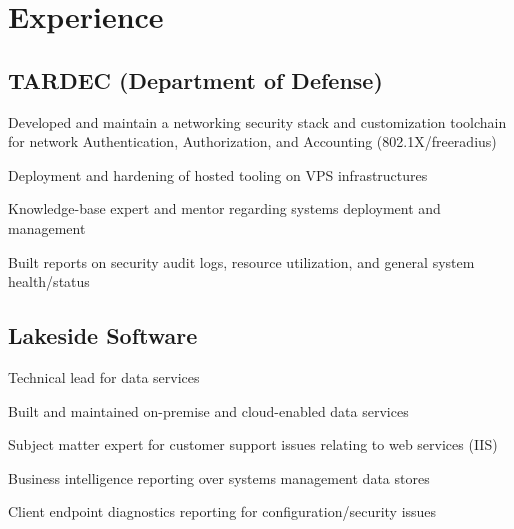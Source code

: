 \documentclass[]{deedy-resume-openfont}
\begin{document}
\hfill
\begin{minipage}[t]{0.66\textwidth}


\section{Experience}

\subsection{TARDEC (Department of Defense)}
\vspace{\topsep} 
\begin{tightemize}
\item Developed and maintain a networking security stack and customization toolchain for network Authentication, Authorization, and Accounting (802.1X/freeradius)
\item Deployment and hardening of hosted tooling on VPS infrastructures
\item Knowledge-base expert and mentor regarding systems deployment and management
\item Built reports on security audit logs, resource utilization, and general system health/status
\end{tightemize}
\sectionsep

\subsection{Lakeside Software}
\begin{tightemize}
\item Technical lead for data services
\item Built and maintained on-premise and cloud-enabled data services
\item Subject matter expert for customer support issues relating to web services (IIS)
\item Business intelligence reporting over systems management data stores
\item Client endpoint diagnostics reporting for configuration/security issues
\end{tightemize}
\sectionsep


\end{minipage}
\end{document}
